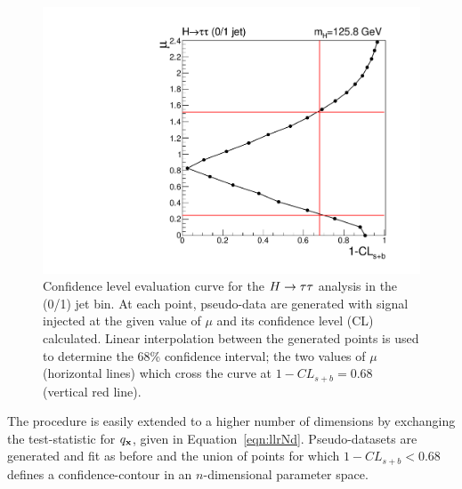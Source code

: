 \begin{figure}
\begin{center}
\includegraphics[width=.7\textwidth]{combinations/confcurve_htt.pdf}
\caption{Confidence level evaluation curve for the $H\rightarrow\tau\tau$ analysis in the (0/1) jet bin. 
At each point, pseudo-data are generated with signal injected at the given value of $\mu$
and its confidence level (CL) calculated.
Linear interpolation between the generated points is used to determine the 68\% confidence 
interval; the two values of $\mu$ (horizontal lines) which cross the curve at $1-CL_{s+b}=0.68$
(vertical red line).}
\label{fig:confcontour}
\end{center}
\end{figure}
The procedure is easily extended to a higher number of dimensions
by exchanging the test-statistic for $q_{{\mathbf{x}}}$, given in Equation~\ref{eqn:llrNd}.
Pseudo-datasets are generated and fit as before and the union of points for which
$1-CL_{s+b}<0.68$ defines a confidence-contour in an $n$-dimensional parameter space.


